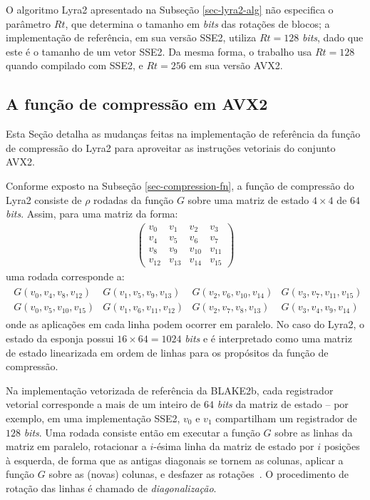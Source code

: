 \documentclass{article}
\begin{document}
O algoritmo Lyra2 apresentado na Subseção \ref{sec-lyra2-alg} não
especifica o parâmetro $Rt$, que determina o tamanho em \emph{bits} das
rotações de blocos; a implementação de referência, em sua versão SSE2,
utiliza $Rt = 128$ \emph{bits}, dado que este é o tamanho de um vetor SSE2.
Da mesma forma, o trabalho usa $Rt = 128$ quando compilado com
SSE2, e $Rt = 256$ em sua versão AVX2.

\subsection{A função de compressão em AVX2 }\label{sec-compression-fn-avx2}

Esta Seção detalha as mudanças feitas na implementação de referência da
função de compressão do Lyra2 para aproveitar as instruções vetoriais do
conjunto AVX2.

Conforme exposto na Subseção \ref{sec-compression-fn}, a função de
compressão do Lyra2 consiste de $\rho$ rodadas da função $G$ sobre uma
matriz de estado $4 \times 4$ de $64$ \emph{bits}. Assim, para uma matriz
da forma:
\begin{align*}
\left(
\begin{matrix}
v_{0} & v_{1} & v_{2} & v_{3} \\
v_{4} & v_{5} & v_{6} & v_{7} \\
v_{8} & v_{9} & v_{10} & v_{11} \\
v_{12} & v_{13} & v_{14} & v_{15}
\end{matrix}
\right)
\end{align*}
uma rodada corresponde a:
\begin{align*}
\begin{matrix}
G(v_{0}, v_{4}, v_{8}, v_{12}) & G(v_{1}, v_{5}, v_{9}, v_{13}) & G(v_{2}, v_{6}, v_{10}, v_{14}) & G(v_{3}, v_{7}, v_{11}, v_{15}) \\
G(v_{0}, v_{5}, v_{10}, v_{15}) & G(v_{1}, v_{6}, v_{11}, v_{12}) & G(v_{2}, v_{7}, v_{8}, v_{13}) & G(v_{3}, v_{4}, v_{9}, v_{14})
\end{matrix}
\end{align*}
onde as aplicações em cada linha podem ocorrer em paralelo. No caso do
Lyra2, o estado da esponja possui $16 \times 64 = 1024$ \emph{bits} e é
interpretado como uma matriz de estado linearizada em ordem de linhas
para os propósitos da função de compressão.

Na implementação vetorizada de referência da BLAKE2b, cada registrador
vetorial corresponde a mais de um inteiro de $64$ \emph{bits} da matriz de
estado -- por exemplo, em uma implementação SSE2, $v_{0}$ e $v_{1}$
compartilham um registrador de $128$ \emph{bits}. Uma rodada consiste então
em executar a função $G$ sobre as linhas da matriz em paralelo, rotacionar
a $i$-ésima linha da matriz de estado por $i$ posições à esquerda, de forma
que as antigas diagonais se tornem as colunas, aplicar a função $G$ sobre
as (novas) colunas, e desfazer as rotações~\cite{blake2b}. O
procedimento de rotação das linhas é chamado de \emph{diagonalização}.
\end{document}
